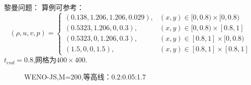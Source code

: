 \documentclass{book}
\begin{document}
\begin{example}黎曼问题：
  算例可参考：\cite{RN114}
  \begin{equation}
    (\rho, u, v, p)=\begin{cases}
      (0.138,1.206,1.206,0.029), & (x, y) \in[0,0.8) \times[0,0.8) \\
      (0.5323,1.206,0,0.3),      & (x, y) \in[0,0.8) \times[0.8,1] \\
      (0.5323,0,1.206,0.3),      & (x, y) \in[0.8,1] \times[0,0.8) \\
      (1.5,0,0,1.5),             & (x, y) \in[0.8,1] \times[0.8,1]
    \end{cases}
  \end{equation}
  $t_{end}=0.8$,网格为$400\times400$.

  \begin{figure}[ht]%
    \centering
    \quad
    \caption{WENO-JS,M=200,等高线：0.2:0.05:1.7}
  \end{figure}
\end{example}
\end{document}
